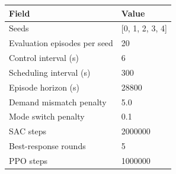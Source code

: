 \begin{tabular}{ll}
\toprule
Field & Value\\
\midrule
Seeds & [0, 1, 2, 3, 4]\\
Evaluation episodes per seed & 20\\
Control interval (s) & 6\\
Scheduling interval (s) & 300\\
Episode horizon (s) & 28800\\
Demand mismatch penalty & 5.0\\
Mode switch penalty & 0.1\\
SAC steps & 2000000\\
Best-response rounds & 5\\
PPO steps & 1000000\\
\bottomrule
\end{tabular}